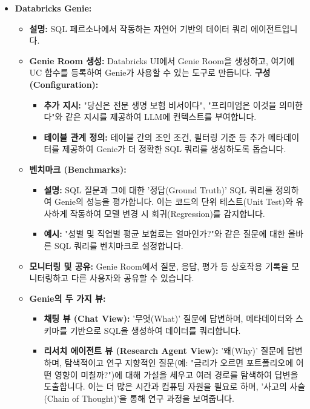 \documentclass[11pt,a4paper]{article}
\theoremstyle{definition}
\begin{document}
\begin{itemize}
    \item \textbf{Databricks Genie:}
    \begin{itemize}
        \item \textbf{설명:} SQL 페르소나에서 작동하는 자연어 기반의 데이터 쿼리 에이전트입니다.
        \item \textbf{Genie Room 생성:} Databricks UI에서 Genie Room을 생성하고, 여기에 UC 함수를 등록하여 Genie가 사용할 수 있는 도구로 만듭니다.
        \textbf{구성 (Configuration):}
        \begin{itemize}
            \item \textbf{추가 지시:} "당신은 전문 생명 보험 비서이다", "프리미엄은 이것을 의미한다"와 같은 지시를 제공하여 LLM에 컨텍스트를 부여합니다.
            \item \textbf{테이블 관계 정의:} 테이블 간의 조인 조건, 필터링 기준 등 추가 메타데이터를 제공하여 Genie가 더 정확한 SQL 쿼리를 생성하도록 돕습니다.
        \end{itemize}
        \item \textbf{벤치마크 (Benchmarks):}
        \begin{itemize}
            \item \textbf{설명:} SQL 질문과 그에 대한 '정답(Ground Truth)' SQL 쿼리를 정의하여 Genie의 성능을 평가합니다. 이는 코드의 단위 테스트(Unit Test)와 유사하게 작동하여 모델 변경 시 회귀(Regression)를 감지합니다.
            \item \textbf{예시:} "성별 및 직업별 평균 보험료는 얼마인가?"와 같은 질문에 대한 올바른 SQL 쿼리를 벤치마크로 설정합니다.
        \end{itemize}
        \item \textbf{모니터링 및 공유:} Genie Room에서 질문, 응답, 평가 등 상호작용 기록을 모니터링하고 다른 사용자와 공유할 수 있습니다.
        \item \textbf{Genie의 두 가지 뷰:}
        \begin{itemize}
            \item \textbf{채팅 뷰 (Chat View):} '무엇(What)' 질문에 답변하며, 메타데이터와 스키마를 기반으로 SQL을 생성하여 데이터를 쿼리합니다.
            \item \textbf{리서치 에이전트 뷰 (Research Agent View):} '왜(Why)' 질문에 답변하며, 탐색적이고 연구 지향적인 질문(예: "금리가 오르면 포트폴리오에 어떤 영향이 미칠까?")에 대해 가설을 세우고 여러 경로를 탐색하여 답변을 도출합니다. 이는 더 많은 시간과 컴퓨팅 자원을 필요로 하며, '사고의 사슬(Chain of Thought)'을 통해 연구 과정을 보여줍니다.
        \end{itemize}
    \end{itemize}
\end{itemize}
\end{document}
